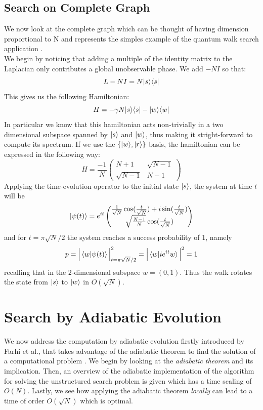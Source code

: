 \subsection{Search on Complete Graph}
We now look at the complete graph which can be thought of having dimension proportional to N and represents the simples example of the quantum walk search application \cite{Childs2004}. \\We begin by noticing that adding a multiple of the identity matrix to the Laplacian only contributes a global unobservable phase. We add $-NI$ so that:
\begin{equation}
  L - NI = N{|{s}\rangle}{\langle{s}|}
\end{equation}
This gives us the following Hamiltonian:
\begin{equation}
  H = -\gamma N {|{s}\rangle}{\langle{s}|} - {|{w}\rangle}{\langle{w}|}
\end{equation}
In particular we know that this hamiltonian acts non-trivially in a two dimensional subspace spanned by ${|{s}\rangle}$ and ${|{w}\rangle}$, thus making it stright-forward to compute its spectrum. If we use the $\{{|{w}\rangle}, {|{r}\rangle}\}$ basis, the hamiltonian can be expressed in the following way:
\begin{equation}
  H = \frac{-1}{N} \begin{pmatrix} N+1 & \sqrt{N-1}\\ \sqrt{N-1} & N-1 \end{pmatrix}
\end{equation}
Applying the time-evolution operator to the initial state ${|{s}\rangle}$, the system at time $t$ will be
\begin{equation}
  {|{\psi(t)}\rangle} = e^{it}
  \begin{pmatrix}
  \frac{1}{\sqrt{N}}\cos(\frac{t}{\sqrt{N}}) +i\sin(\frac{t}{\sqrt{N}})\\
  \sqrt{\frac{N-1}{N}}\cos(\frac{t}{\sqrt{N}})
  \end{pmatrix}
  \label{eq:qw_state}
\end{equation}
and for $t=\pi\sqrt{N}/2$ the system reaches a success probability of 1, namely
\begin{equation}
  p = \Big|\braket{w|\psi(t)}\Big|^2_{t=\pi\sqrt{N}/2} = \Big|\braket{w |  ie^{it}w}\Big|^2 = 1
\end{equation}
recalling that in the 2-dimensional subspace $w = (0,1)$. Thus the walk rotates the state from ${|{s}\rangle}$ to ${|{w}\rangle}$ in $O(\sqrt{N})$.

\section{Search by Adiabatic Evolution}
We now address the computation by adiabatic evolution firstly introduced by Farhi et al., that takes advantage of the adiabatic theorem to find the solution of a computational problem \cite{Farhi2000}. We begin by looking at the \textit{adiabatic theorem} and its implication. Then, an overview of the adiabatic implementation of the algorithm for solving the unstructured search problem is given which has a time scaling of $O(N)$. Lastly, we see how applying the adiabatic theorem \textit{locally} can lead to a time of order $O(\sqrt{N})$ which is optimal.


